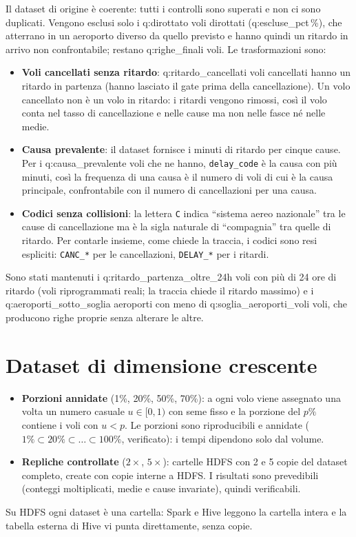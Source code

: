 \documentclass[11pt,a4paper]{article}
\newcommand{\Q}[1]{\csname q:#1\endcsname}
\newcommand{\code}[1]{\texttt{#1}}
\begin{document}
Il dataset di origine è coerente: tutti i controlli sono superati e non ci sono duplicati. Vengono esclusi solo i
\Q{dirottato} voli dirottati (\Q{escluse_pct}\,\%), che atterrano in un aeroporto diverso da quello previsto e hanno
quindi un ritardo in arrivo non confrontabile; restano \Q{righe_finali} voli. Le trasformazioni sono:
\begin{itemize}
  \item \textbf{Voli cancellati senza ritardo}: \Q{ritardo_cancellati} voli cancellati hanno un ritardo in partenza
        (hanno lasciato il gate prima della cancellazione). Un volo cancellato non è un volo in ritardo: i ritardi
        vengono rimossi, così il volo conta nel tasso di cancellazione e nelle cause ma non nelle fasce né nelle medie.
  \item \textbf{Causa prevalente}: il dataset fornisce i minuti di ritardo per cinque cause. Per i \Q{causa_prevalente}
        voli che ne hanno, \code{delay\_code} è la causa con più minuti, così la frequenza di una causa è il numero di
        voli di cui è la causa principale, confrontabile con il numero di cancellazioni per una causa.
  \item \textbf{Codici senza collisioni}: la lettera \code{C} indica ``sistema aereo nazionale'' tra le cause di
        cancellazione ma è la sigla naturale di ``compagnia'' tra quelle di ritardo. Per contarle insieme, come
        chiede la traccia, i codici sono resi espliciti: \code{CANC\_*} per le cancellazioni, \code{DELAY\_*} per i
        ritardi.
\end{itemize}
Sono stati mantenuti i \Q{ritardo_partenza_oltre_24h} voli con più di 24 ore di ritardo (voli riprogrammati reali;
la traccia chiede il ritardo massimo) e i \Q{aeroporti_sotto_soglia} aeroporti con meno di
\Q{soglia_aeroporti_voli} voli, che producono righe proprie senza alterare le altre.

\section{Dataset di dimensione crescente}\label{sec:dimensioni}
\begin{itemize}
  \item \textbf{Porzioni annidate} (1\%, 20\%, 50\%, 70\%): a ogni volo viene assegnato una volta un numero casuale
        $u\in[0,1)$ con seme fisso e la porzione del $p\%$ contiene i voli con $u<p$. Le porzioni sono riproducibili e
        annidate ($1\%\subset20\%\subset\dots\subset100\%$, verificato): i tempi dipendono solo dal volume.
  \item \textbf{Repliche controllate} ($2\times$, $5\times$): cartelle HDFS con 2 e 5 copie del dataset completo,
        create con copie interne a HDFS. I risultati sono prevedibili (conteggi moltiplicati, medie e cause invariate),
        quindi verificabili.
\end{itemize}
Su HDFS ogni dataset è una cartella: Spark e Hive leggono la cartella intera e la tabella esterna di Hive vi punta
direttamente, senza copie.
\end{document}
